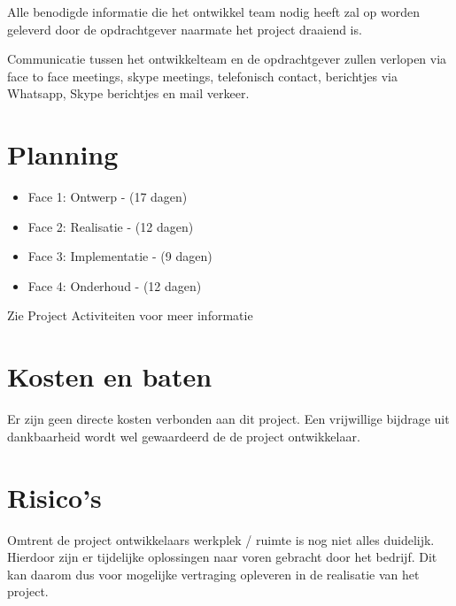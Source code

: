 \documentclass[]{report}
\begin{document}
Alle benodigde informatie die het ontwikkel team nodig heeft zal op worden geleverd door de opdrachtgever naarmate het project draaiend is. 

Communicatie tussen het ontwikkelteam en de opdrachtgever zullen verlopen via face to face meetings, skype meetings, telefonisch contact, berichtjes via Whatsapp, Skype berichtjes en mail verkeer.




\chapter{Planning}

\begin{itemize}
	\item Face 1: Ontwerp - (17 dagen)	
	\item Face 2: Realisatie - (12 dagen)	
	\item Face 3: Implementatie  - (9 dagen)	
	\item Face 4: Onderhoud  - (12 dagen)
		\newline
\end{itemize} 

Zie Project Activiteiten voor meer informatie




\chapter{Kosten en baten}

Er zijn geen directe kosten verbonden aan dit project. Een vrijwillige bijdrage uit dankbaarheid wordt wel gewaardeerd de de project ontwikkelaar.




\chapter{Risico’s}

Omtrent de project ontwikkelaars werkplek / ruimte is nog niet alles duidelijk. Hierdoor zijn er tijdelijke oplossingen naar voren gebracht door het bedrijf. Dit kan daarom dus voor mogelijke vertraging opleveren in de realisatie van het project.
\end{document}
